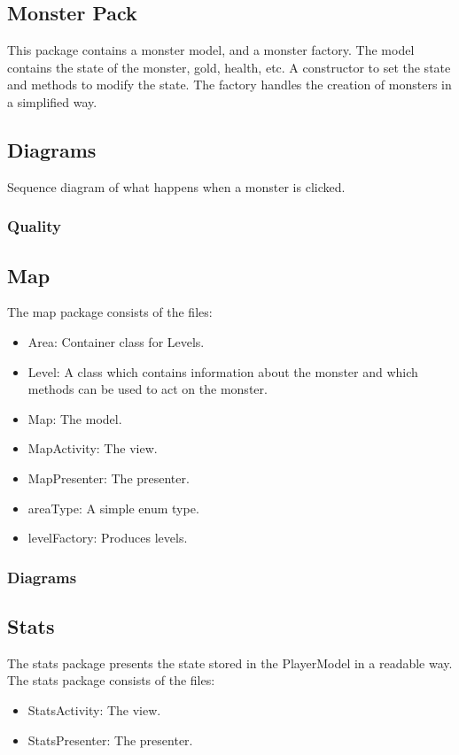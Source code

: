 \documentclass{article}
\begin{document}
\subsection{Monster Pack}
This package contains a monster model, and a monster factory. The model contains the state of the monster, gold, health, etc. A constructor to set the state and methods
to modify the state. The factory handles the creation of monsters in a simplified way.

\subsection{Diagrams}
\begin{center}
    Sequence diagram of what happens when a monster is clicked.\\
\end{center}

\subsubsection{Quality}

\subsection{Map}
The map package consists of the files:
\begin{itemize}
    \item Area: Container class for Levels.
    \item Level: A class which contains information about the monster and which methods can be used to act on the monster.
    \item Map: The model.
    \item MapActivity: The view.
    \item MapPresenter: The presenter.
    \item areaType: A simple enum type.
    \item levelFactory: Produces levels.
\end{itemize}

\subsubsection{Diagrams}

\subsection{Stats}
The stats package presents the state stored in the PlayerModel in a readable way.\\
The stats package consists of the files:
\begin{itemize}
    \item StatsActivity: The view.
    \item StatsPresenter: The presenter.
\end{itemize}
\end{document}
